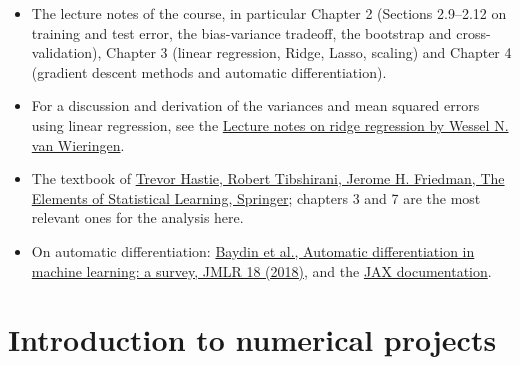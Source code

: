 \documentclass[11pt,a4paper]{article}
\begin{document}
\begin{itemize}[nosep]
  \item The lecture notes of the course, in particular Chapter 2 (Sections
        2.9--2.12 on training and test error, the bias-variance tradeoff, the
        bootstrap and cross-validation), Chapter 3 (linear regression, Ridge,
        Lasso, scaling) and Chapter 4 (gradient descent methods and
        automatic differentiation).
  \item For a discussion and derivation of the variances and mean squared
        errors using linear regression, see the
        \href{https://arxiv.org/abs/1509.09169}{Lecture notes on ridge
        regression by Wessel N. van Wieringen}.
  \item The textbook of
        \href{https://www.springer.com/gp/book/9780387848570}{Trevor Hastie,
        Robert Tibshirani, Jerome H. Friedman, The Elements of Statistical
        Learning, Springer}; chapters 3 and 7 are the most relevant ones for
        the analysis here.
  \item On automatic differentiation:
        \href{https://jmlr.org/papers/v18/17-468.html}{Baydin et al.,
        Automatic differentiation in machine learning: a survey, JMLR 18
        (2018)}, and the \href{https://jax.readthedocs.io}{JAX documentation}.
\end{itemize}

\section*{Introduction to numerical projects}
\end{document}
